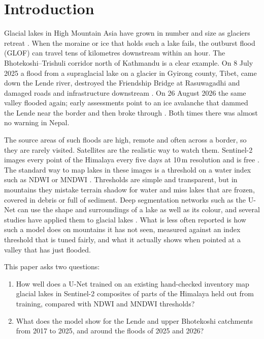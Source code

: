 \documentclass[11pt,a4paper]{article}
\begin{document}
\section{Introduction}

Glacial lakes in High Mountain Asia have grown in number and size as glaciers retreat \cite{shugar2020,wang2020}. When the moraine or ice that holds such a lake fails, the outburst flood (GLOF) can travel tens of kilometres downstream within an hour. The Bhotekoshi--Trishuli corridor north of Kathmandu is a clear example. On 8 July 2025 a flood from a supraglacial lake on a glacier in Gyirong county, Tibet, came down the Lende river, destroyed the Friendship Bridge at Rasuwagadhi and damaged roads and infrastructure downstream \cite{icimod2025}. On 26 August 2026 the same valley flooded again; early assessments point to an ice avalanche that dammed the Lende near the border and then broke through \cite{icimod2026}. Both times there was almost no warning in Nepal.

The source areas of such floods are high, remote and often across a border, so they are rarely visited. Satellites are the realistic way to watch them. Sentinel-2 images every point of the Himalaya every five days at 10\,m resolution and is free \cite{drusch2012}. The standard way to map lakes in these images is a threshold on a water index such as NDWI \cite{mcfeeters1996} or MNDWI \cite{xu2006}. Thresholds are simple and transparent, but in mountains they mistake terrain shadow for water and miss lakes that are frozen, covered in debris or full of sediment. Deep segmentation networks such as the U-Net \cite{ronneberger2015} can use the shape and surroundings of a lake as well as its colour, and several studies have applied them to glacial lakes \cite{qayyum2020}. What is less often reported is how such a model does on mountains it has not seen, measured against an index threshold that is tuned fairly, and what it actually shows when pointed at a valley that has just flooded.

This paper asks two questions:
\begin{enumerate}[label=\textbf{Q\arabic*.}]
\item How well does a U-Net trained on an existing hand-checked inventory map glacial lakes in Sentinel-2 composites of parts of the Himalaya held out from training, compared with NDWI and MNDWI thresholds?
\item What does the model show for the Lende and upper Bhotekoshi catchments from 2017 to 2025, and around the floods of 2025 and 2026?
\end{enumerate}
\end{document}
